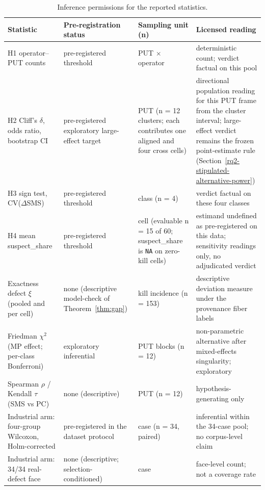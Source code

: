 \documentclass[review,12pt,authoryear]{elsarticle}
\newcounter{none}                   %
\begin{document}
{\def\LTcaptype{table} %
\begin{longtable}[]{@{}
  >{\raggedright\arraybackslash}p{}
  >{\raggedright\arraybackslash}p{}
  >{\raggedright\arraybackslash}p{}
  >{\raggedright\arraybackslash}p{}@{}}
\caption{Inference permissions for the reported statistics.}\label{tab:inference-permissions}\\
\toprule\noalign{}
Statistic & Pre-registration status & Sampling unit (n) & Licensed reading \\
\midrule\noalign{}
\endfirsthead
\endhead
\bottomrule\noalign{}
\endlastfoot
H1 operator--PUT counts & pre-registered threshold & PUT $\times$
operator & deterministic count; verdict factual on this pool \\
H2 Cliff's $\delta$, odds ratio, bootstrap CI & pre-registered
exploratory large-effect target & PUT (n = 12 clusters; each contributes
one aligned and four cross cells) & directional population reading for
this PUT frame from the cluster interval; large-effect verdict remains
the frozen point-estimate rule
(Section~\ref{rq2-stipulated-alternative-power}) \\
H3 sign test, CV($\Delta$SMS) & pre-registered threshold & class (n = 4)
& verdict factual on these four classes \\
H4 mean suspect\_share & pre-registered threshold & cell (evaluable
n = 15 of 60; suspect\_share is \texttt{NA} on zero-kill cells) &
estimand undefined as pre-registered on this data; sensitivity readings
only, no adjudicated verdict \\
Exactness defect $\xi$ (pooled and per cell) & none (descriptive
model-check of Theorem~\ref{thm:gap}) & kill incidence (n = 153) &
descriptive deviation measure under the provenance fiber labels \\
Friedman $\chi^2$ (MP effect; per-class Bonferroni) & exploratory
inferential & PUT blocks (n = 12) & non-parametric alternative after
mixed-effects singularity; exploratory \\
Spearman $\rho$ / Kendall $\tau$ (SMS vs PC) & none (descriptive) & PUT
(n = 12) & hypothesis-generating only \\
Industrial arm: four-group Wilcoxon, Holm-corrected & pre-registered in
the dataset protocol & case (n = 34, paired) & inferential within the
34-case pool; no corpus-level claim \\
Industrial arm: 34/34 real-defect face & none (descriptive; selection-conditioned) & case &
face-level count; not a coverage rate \\
\end{longtable}
}
\end{document}
